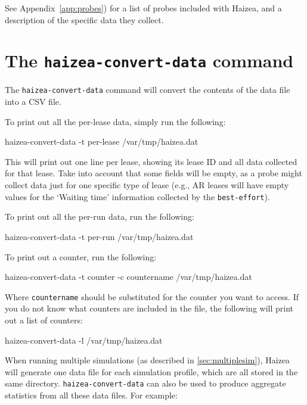 See Appendix~\ref{app:probes}) for a list of probes included with Haizea, and a description of the specific data they collect.


\section{The \texttt{haizea-convert-data} command}

The \texttt{haizea-convert-data} command will convert the contents of the data file into a CSV file. 

To print out all the per-lease data, simply run the following: 

\begin{shellverbatim}
haizea-convert-data -t per-lease /var/tmp/haizea.dat
\end{shellverbatim}

This will print out one line per lease, showing its lease ID and all data collected for that lease. Take into account that some fields will be empty, as a probe might collect data just for one specific type of lease (e.g., AR leases will have empty values for the `Waiting time' information collected by the \texttt{best-effort}).

To print out all the per-run data, run the following:

\begin{shellverbatim}
haizea-convert-data -t per-run /var/tmp/haizea.dat
\end{shellverbatim}

To print out a counter, run the following:

\begin{shellverbatim}
haizea-convert-data -t counter -c countername /var/tmp/haizea.dat
\end{shellverbatim}

Where \texttt{countername} should be substituted for the counter you want to access. If you do not know what counters are included in the file, the following will print out a list of counters:

\begin{shellverbatim}
haizea-convert-data -l /var/tmp/haizea.dat
\end{shellverbatim}

When running multiple simulations (as described in \ref{sec:multiplesim}), Haizea will generate one data file for each simulation profile, which are all stored in the same directory. \texttt{haizea-convert-data} can also be used to produce aggregate statistics from all these data files. For example:

